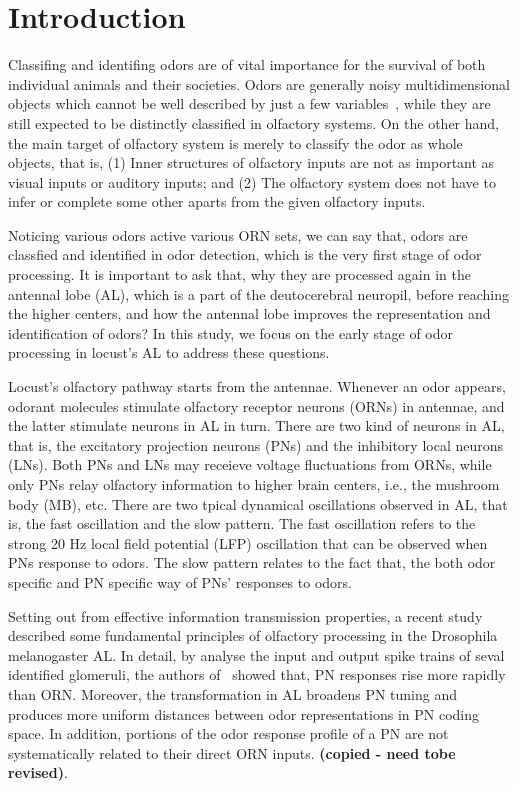 \documentclass[12pt, a4paper]{article}
\begin{document}
\section{Introduction}

Classifing and identifing odors are of vital importance for the survival of both individual animals and their societies. Odors are generally noisy multidimensional objects which cannot be well described by just a few variables~\citep{Wilson2006}, while they are still expected to be distinctly classified in olfactory systems. On the other hand, the main target of olfactory system is merely to classify the odor as whole objects, that is, (1) Inner structures of olfactory inputs are not as important as visual inputs or auditory inputs; and (2) The olfactory system does not have to infer or complete some other aparts from the given olfactory inputs.

Noticing various odors active various ORN sets, we can say that, odors are classfied and identified in odor detection, which is the very first stage of odor processing. It is important to ask that, why they are processed again in the antennal lobe (AL), which is a part of the deutocerebral neuropil, before reaching the higher centers, and how the antennal lobe improves the representation and identification of odors? In this study, we focus on the early stage of odor processing in locust's AL to address these questions.

Locust's olfactory pathway starts from the antennae. Whenever an odor appears, odorant molecules stimulate olfactory receptor neurons (ORNs) in antennae, and the latter stimulate neurons in AL in turn. There are two kind of neurons in AL, that is, the excitatory projection neurons (PNs) and the inhibitory local neurons (LNs). Both PNs and LNs may receieve voltage fluctuations from ORNs, while only PNs relay olfactory information to higher brain centers, i.e., the mushroom body (MB), etc. %
There are two tpical dynamical oscillations observed in AL, that is, the fast oscillation and the slow pattern. The fast oscillation refers to the strong 20 Hz local field potential (LFP) oscillation that can be observed when PNs response to odors. The slow pattern relates to the fact that, the both odor specific and PN specific way of PNs' responses to odors.

Setting out from effective information transmission properties, a recent study~\citep{Bhandawat2007} described some fundamental principles of olfactory processing in the Drosophila melanogaster AL. In detail, by analyse the input and output spike trains of seval identified glomeruli, the authors of~\citep{Bhandawat2007} showed that, PN responses rise more rapidly than ORN. Moreover, the transformation in AL broadens PN tuning and produces more uniform distances between odor representations in PN coding space. In addition, portions of the odor response profile of a PN are not systematically related to their direct ORN inputs. {\bf (copied - need tobe revised)}. %
\end{document}
